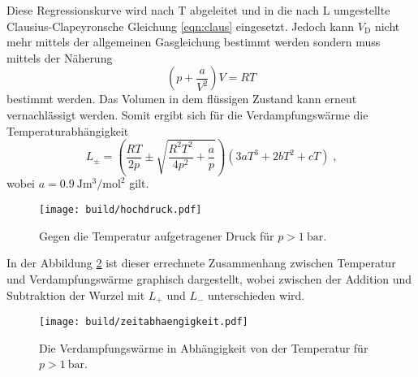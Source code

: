 Diese Regressionskurve wird nach T abgeleitet und in die nach L umgestellte Clausius-Clapeyronsche Gleichung \eqref{eqn:claus} eingesetzt.
Jedoch kann $V_\text{D}$ nicht mehr mittels der allgemeinen Gasgleichung bestimmt werden sondern muss mittels der Näherung
\begin{equation*}
    \left( p + \frac{a}{V^2}\right) V = RT
\end{equation*}
bestimmt werden.
Das Volumen in dem flüssigen Zustand kann erneut vernachlässigt werden.
Somit ergibt sich für die Verdampfungswärme die Temperaturabhängigkeit
\begin{equation*}
    L_\pm = \left( \frac{RT}{2p} \pm \sqrt{\frac{R^2T^2}{4p^2} + \frac{a}{p}}\right)\left( 3aT^3 + 2bT^2 + cT \right) \; \text{,}
\end{equation*} 
wobei $a = \SI{0.9}{\joule\metre\tothe{3}\per\mole\squared}$ gilt.
\begin{figure}
    \centering
    \caption{Gegen die Temperatur aufgetragener Druck für $p > \SI{1}{\bar}$.}
    \label{fig:hochdruck}
    \texttt{[image: build/hochdruck.pdf]}
\end{figure}
In der Abbildung \ref{fig:Zeitabhaengigkeit} ist dieser errechnete Zusammenhang zwischen Temperatur und Verdampfungswärme graphisch dargestellt, wobei zwischen der Addition und 
Subtraktion der Wurzel mit $L_+$ und $L_-$ unterschieden wird.
\begin{figure}
    \centering
    \caption{Die Verdampfungswärme in Abhängigkeit von der Temperatur für $p > \SI{1}{\bar}$.}
    \label{fig:Zeitabhaengigkeit}
    \texttt{[image: build/zeitabhaengigkeit.pdf]}
\end{figure}